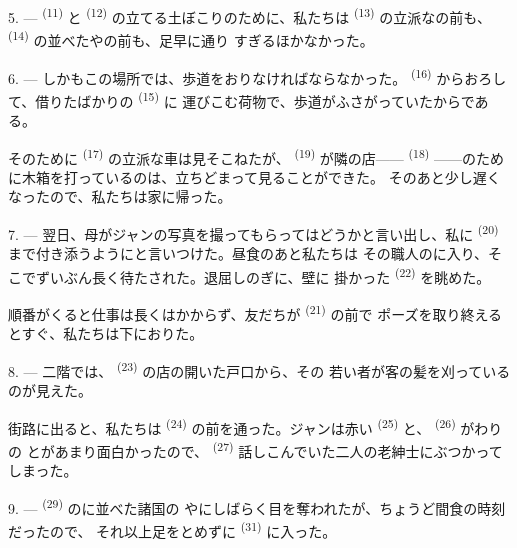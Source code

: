 5. ---  \textsuperscript{(11)} と
\textsuperscript{(12)} の立てる土ぼこりのために、私たちは
\textsuperscript{(13)} の立派なの前も、
\textsuperscript{(14)} の並べたやの前も、足早に通り
すぎるほかなかった。

6. --- しかもこの場所では、歩道をおりなければならなかった。
\textsuperscript{(16)} からおろして、借りたばかりの \textsuperscript{(15)} に
運びこむ荷物で、歩道がふさがっていたからである。

そのために \textsuperscript{(17)} の立派な車は見そこねたが、
 \textsuperscript{(19)} が隣の店——
\textsuperscript{(18)} ——のために木箱を打っているのは、立ちどまって見ることができた。
そのあと少し遅くなったので、私たちは家に帰った。

\VUsaut{3.0mm}

7. --- 翌日、母がジャンの写真を撮ってもらってはどうかと言い出し、私に
 \textsuperscript{(20)} まで付き添うようにと言いつけた。昼食のあと私たちは
その職人のに入り、そこでずいぶん長く待たされた。退屈しのぎに、壁に
掛かった \textsuperscript{(22)} を眺めた。

順番がくると仕事は長くはかからず、友だちが \textsuperscript{(21)} の前で
ポーズを取り終えるとすぐ、私たちは下におりた。

8. --- 二階では、 \textsuperscript{(23)} の店の開いた戸口から、その
若い者が客の髪を刈っているのが見えた。

街路に出ると、私たちは \textsuperscript{(24)} の前を通った。ジャンは赤い
 \textsuperscript{(25)} と、 \textsuperscript{(26)} がわりの
とがあまり面白かったので、
\textsuperscript{(27)} 話しこんでいた二人の老紳士にぶつかってしまった。

\VUsaut{3.0mm}

9. ---  \textsuperscript{(29)} のに並べた諸国の
やにしばらく目を奪われたが、ちょうど間食の時刻だったので、
それ以上足をとめずに \textsuperscript{(31)} に入った。

